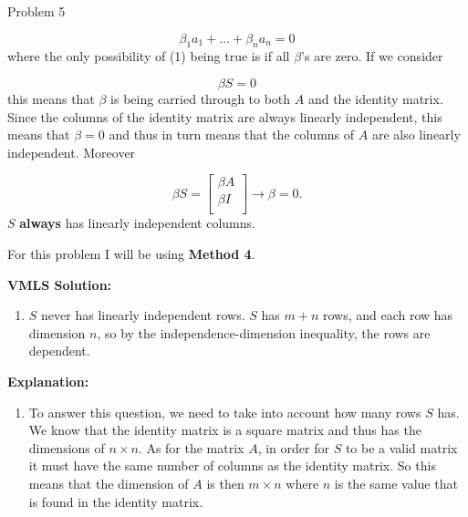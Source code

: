 \begin{problem}{Problem 5}
\begin{Highlight}
\begin{enumerate}[label = (\alph*)]
            \setcounter{equation}{0}
            \begin{equation}
                \beta_{1}a_{1} + \dots + \beta_{n}a_{n} = 0
            \end{equation}
            where the only possibility of (1) being true is if all $\beta$'s are zero. If we consider
    
            \begin{equation}
                \beta S = 0
            \end{equation}
            this means that $\beta$ is being carried through to both $A$ and the identity matrix. Since the columns of the identity matrix are always linearly independent, this means that $\beta = 0$ and
            thus in turn means that the columns of $A$ are also linearly independent. Moreover 
    
            \begin{equation}
                \beta S = 
                \begin{bmatrix}
                    \beta A \\
                    \beta I \\
                \end{bmatrix}
                \rightarrow \beta = 0.
            \end{equation}
            $S$ \textbf{always} has linearly independent columns.
        \end{enumerate}

    \end{Highlight}

    \begin{Highlight}
        For this problem I will be using \textbf{Method 4}. \vspace*{1em}

        \noindent \textbf{VMLS Solution:}

        \begin{enumerate}[label = (\alph*), start = 2]
            \item $S$ never has linearly independent rows. $S$ has $m+n$ rows, and each row has dimension $n$, so by the independence-dimension inequality, the rows are dependent.
        \end{enumerate}

        \noindent \textbf{Explanation:}

        \begin{enumerate}[label = (\alph*), start = 2]
            \item To answer this question, we need to take into account how many rows $S$ has. We know that the identity matrix is a square matrix and thus has the dimensions of $n \times n$. As for the matrix 
            $A$, in order for $S$ to be a valid matrix it must have the same number of columns as the identity matrix. So this means that the dimension of $A$ is then $m \times n$ where $n$ is the same value
            that is found in the identity matrix. 
    

\end{enumerate}
\end{Highlight}
\end{problem}
